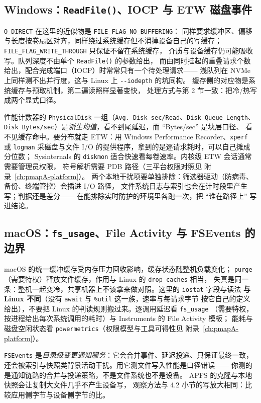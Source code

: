 \documentclass[12pt,a4paper,fontset=fandol]{ctexbook}
\newcommand{\Fn}[1]{\texttt{#1()}}
\newcommand{\Tp}[1]{\texttt{#1}}
\newcommand{\Opt}[1]{\texttt{-\/-#1}}
\newcommand{\Bk}{\discretionary{}{}{}}
\begin{document}
\subsection{Windows：\Fn{ReadFile}、IOCP 与 ETW 磁盘事件}
\label{sub:pm08-win}

\Tp{O\_DIRECT} 在这里的近似物是 \Tp{FILE{\Bk}\_FLAG{\Bk}\_NO{\Bk}\_BUFFERING}：
同样要求缓冲区、偏移与长度按卷扇区对齐，同样绕过系统缓存但不消掉设备自己的写缓存；
\Tp{FILE{\Bk}\_FLAG{\Bk}\_WRITE{\Bk}\_THROUGH} 只保证不留在系统缓存，
介质与设备缓存仍可能吸收写。队列深度不由单个 \Fn{ReadFile} 的参数给出，
而由同时挂起的重叠请求个数给出，配合完成端口（IOCP）时常常只有一个待处理请求——
浅队列在 NVMe 上同样测不出并行度，这与 Linux 上 \Opt{iodepth} 的坑同构。
缓存侧的对应物是系统缓存与预取机制，第二遍读照样显著变快，
处理方式与第 2 节一致：把冷/热写成两个显式口径。

性能计数器的 \Tp{PhysicalDisk} 一组（\Tp{Avg. Disk sec/Read}、\Tp{Disk Queue Length}、
\Tp{Disk Bytes/sec}）是\emph{派生均值}，看不到尾延迟，而 ``Bytes/sec'' 是块层口径、
看不见缓存命中。要分布就走 ETW：用 Windows Performance Recorder、\Tp{xperf} 或
\Tp{logman} 采磁盘与文件 I/O 的提供程序，拿到的是逐请求耗时，可以自己摊成分位数；
Sysinternals 的 \Tp{diskmon} 适合快速看每卷速率。内核级 ETW 会话通常需要管理员权限，
符号解析需要 PDB 路径（三平台权限对照见 附录~\ref{ch:pmapA-platform}）。
两个本地干扰项要单独排除：筛选器驱动（防病毒、备份、终端管控）会插进 I/O 路径，
文件系统日志与索引也会在计时段里产生写；判据还是差分——
在能排除实时防护的环境里各跑一次，把 ``谁在路径上'' 写进结论。

\subsection{macOS：\Tp{fs\_usage}、File Activity 与 FSEvents 的边界}
\label{sub:pm08-mac}

macOS 的统一缓冲缓存受内存压力回收影响，缓存状态随整机负载变化；
\Tp{purge}（需要特权）释放文件缓存，作用与 Linux 的 \Tp{drop\_caches} 相当，
失真是同一条：整机一起变冷，共享机器上不该拿来做对照。这里的 \Tp{iostat} 字段与读法
\textbf{与 Linux 不同}（没有 \Tp{await} 与 \Tp{\%util} 这一族，速率与每请求字节
按它自己的定义给出），不要把 Linux 的判读规则搬过来。逐调用延迟看 \Tp{fs\_usage}
（需要特权，按进程给出每次系统调用的耗时）与 Instruments 的 File Activity 模板；
能耗与磁盘空闲状态看 \Tp{powermetrics}（权限模型与工具可得性见
附录~\ref{ch:pmapA-platform}）。

\Tp{FSEvents} 是\emph{目录级变更通知服务}：它会合并事件、延迟投递、只保证最终一致，
还会被索引与快照类背景活动干扰。用它测文件写入性能是口径错误——
你测的是通知链路的合并与投递策略，不是文件系统也不是设备。
APFS 的克隆与本地快照会让复制大文件几乎不产生设备写，
观察方法与 4.2 小节的写放大相同：比较应用侧字节与设备侧字节的比。
\end{document}
